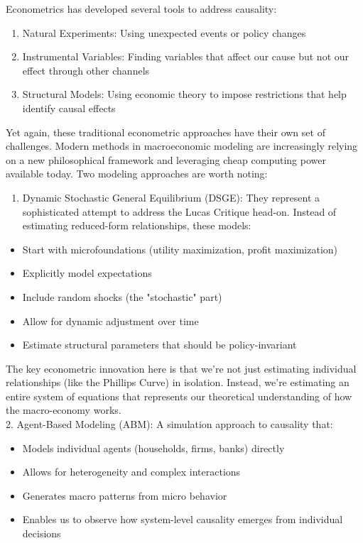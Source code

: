 \documentclass[10pt]{article}
\begin{document}
Econometrics has developed several tools to address causality:

\begin{enumerate}
  \item Natural Experiments: Using unexpected events or policy changes
  \item Instrumental Variables: Finding variables that affect our cause but not our effect through other channels
  \item Structural Models: Using economic theory to impose restrictions that help identify causal effects
\end{enumerate}

Yet again, these traditional econometric approaches have their own set of challenges. Modern methods in macroeconomic modeling are increasingly relying on a new philosophical framework and leveraging cheap computing power available today. Two modeling approaches are worth noting:

\begin{enumerate}
  \item Dynamic Stochastic General Equilibrium (DSGE): They represent a sophisticated attempt to address the Lucas Critique head-on. Instead of estimating reduced-form relationships, these models:
\end{enumerate}

\begin{itemize}
  \item Start with microfoundations (utility maximization, profit maximization)
  \item Explicitly model expectations
  \item Include random shocks (the "stochastic" part)
  \item Allow for dynamic adjustment over time
  \item Estimate structural parameters that should be policy-invariant
\end{itemize}

The key econometric innovation here is that we're not just estimating individual relationships (like the Phillips Curve) in isolation. Instead, we're estimating an entire system of equations that represents our theoretical understanding of how the macro-economy works.\\
2. Agent-Based Modeling (ABM): A simulation approach to causality that:

\begin{itemize}
  \item Models individual agents (households, firms, banks) directly
  \item Allows for heterogeneity and complex interactions
  \item Generates macro patterns from micro behavior
  \item Enables us to observe how system-level causality emerges from individual decisions
\end{itemize}
\end{document}
